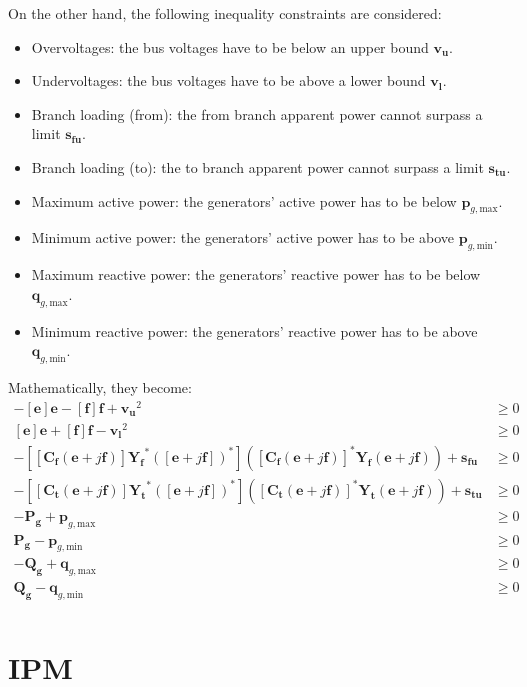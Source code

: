 \documentclass{article}
\begin{document}
On the other hand, the following inequality constraints are considered:
\begin{itemize}
    \item Overvoltages: the bus voltages have to be below an upper bound $\bm{v_u}$.
    \item Undervoltages: the bus voltages have to be above a lower bound $\bm{v_l}$.
    \item Branch loading (from): the from branch apparent power cannot surpass a limit $\bm{s_{fu}}$. 
    \item Branch loading (to): the to branch apparent power cannot surpass a limit $\bm{s_{tu}}$. 
    \item Maximum active power: the generators' active power has to be below $\bm{p}_{g,\text{max}}$.
    \item Minimum active power: the generators' active power has to be above $\bm{p}_{g,\text{min}}$.
    \item Maximum reactive power: the generators' reactive power has to be below $\bm{q}_{g,\text{max}}$.
    \item Minimum reactive power: the generators' reactive power has to be above $\bm{q}_{g,\text{min}}$.
\end{itemize}
Mathematically, they become:
\begin{align}
    - [\bm{e}]\bm{e} - [\bm{f}]\bm{f} + \bm{v_u}^2 & \geq 0 \\
    [\bm{e}]\bm{e} + [\bm{f}]\bm{f} - \bm{v_l}^2 & \geq 0 \\
    - [[\bm{C_f}(\bm{e} + j\bm{f})]\bm{Y_f}^* ([\bm{e} + j\bm{f}])^*] ([\bm{C_f}(\bm{e} + j\bm{f})]^* \bm{Y_f}(\bm{e} + j\bm{f})) + \bm{s_{fu}} & \geq 0 \\
    - [[\bm{C_t}(\bm{e} + j\bm{f})]\bm{Y_t}^* ([\bm{e} + j\bm{f}])^*] ([\bm{C_t}(\bm{e} + j\bm{f})]^* \bm{Y_t}(\bm{e} + j\bm{f})) + \bm{s_{tu}} & \geq 0 \\
    - \bm{P_g} + \bm{p}_{g,\text{max}} & \geq 0 \\
    \bm{P_g} - \bm{p}_{g,\text{min}} & \geq 0 \\
    - \bm{Q_g} + \bm{q}_{g,\text{max}} & \geq 0 \\
    \bm{Q_g} - \bm{q}_{g,\text{min}} & \geq 0 \\
\end{align}

\section{IPM}
\end{document}
